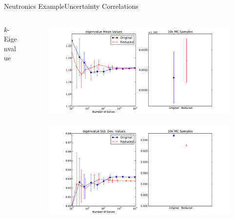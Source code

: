 \documentclass{beamer}
\begin{document}
\begin{frame}{Neutronics Example}{Uncertainty Correlations}\vspace{-20pt}
  \begin{columns}
    \begin{column}{0.3\textwidth}
      \centering
      \vfill
      $k$-Eigenvalue
      \vfill
    \end{column}
    \begin{column}{0.7\textwidth}
      \begin{figure}
        \centering
        \includegraphics[width=\linewidth]{c5g7/C5G7_eigenvalue_mean_reduction}
      \end{figure}
      \vspace{-30pt}
      \begin{figure}
        \centering
        \includegraphics[width=\linewidth]{c5g7/C5G7_eigenvalue_stddev_reduction}
      \end{figure}
    \end{column}
  \end{columns}
\end{frame}
\end{document}
